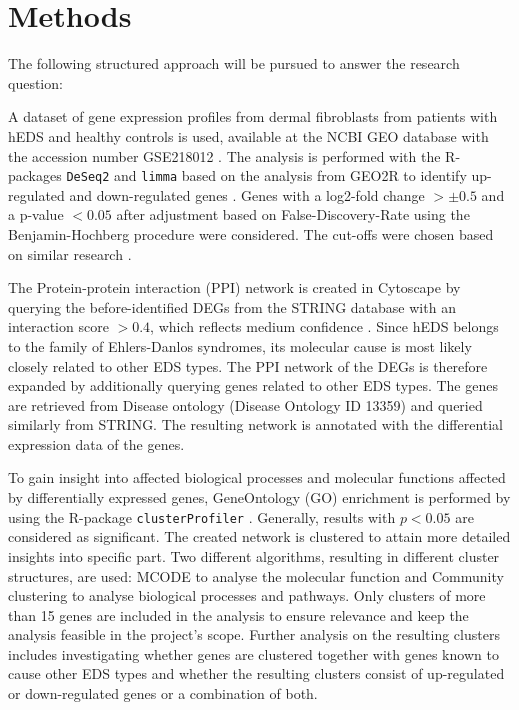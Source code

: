 \section{Methods}
The following structured approach will be pursued to answer the research question:

\begin{description}[leftmargin=5pt]
	\item [Analysis of Differentially Expressed Genes (DEGs).]\label{sec:methods-deg}A dataset of gene expression profiles from dermal fibroblasts from patients with hEDS and healthy controls is used, available at the NCBI GEO database with the accession number GSE218012 \cite{Ritelli2020}. The analysis is performed with the R-packages \texttt{DeSeq2} and \texttt{limma} based on the analysis from GEO2R to identify up-regulated and down-regulated genes \cite{DESeq2, limma}. Genes with a log2-fold change $> \pm 0.5$ and a p-value $< 0.05$ after adjustment based on False-Discovery-Rate using the Benjamin-Hochberg procedure were considered. The cut-offs were chosen based on similar research \cite{Karimizadeh2019, Lim2019}.

	\item[Network Creation.] The Protein-protein interaction (PPI) network is created in Cytoscape \cite{Cytoscape} by querying the before-identified DEGs from the STRING database with an interaction score $> 0.4$, which reflects medium confidence \cite{StringDB}. Since hEDS belongs to the family of Ehlers-Danlos syndromes, its molecular cause is most likely closely related to other EDS types. The PPI network of the DEGs is therefore expanded by additionally querying genes related to other EDS types. The genes are retrieved from Disease ontology (Disease Ontology ID 13359) \cite{DO} and queried similarly from STRING. The resulting network is annotated with the differential expression data of the genes.
	
	\item[Gene Ontology and Clustering.]To gain insight into affected biological processes and molecular functions affected by differentially expressed genes, GeneOntology (GO) enrichment is performed by using the R-package \texttt{clusterProfiler} \cite{Ashburner2000,Consortium2023, Wu2021}. Generally, results with $p < 0.05$ are considered as significant. The created network is clustered to attain more detailed insights into specific part. Two different algorithms, resulting in different cluster structures, are used: MCODE to analyse the molecular function and Community clustering to analyse biological processes and pathways. Only clusters of more than 15 genes are included in the analysis to ensure relevance and keep the analysis feasible in the project's scope. Further analysis on the resulting clusters includes investigating whether genes are clustered together with genes known to cause other EDS types and whether the resulting clusters consist of up-regulated or down-regulated genes or a combination of both.
	

\end{description}
